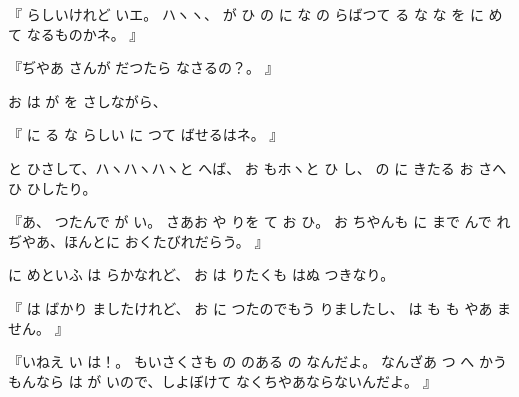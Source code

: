 『
らしいけれど
いエ。
ハヽヽ、
が
ひ
の
に
な
の
らばつて
る
な
な
を
に
めて
なるものかネ。
』

『ぢやあ
さんが
だつたら
なさるの？。
』

お
は
が
を
さしながら、

『
に
る
な
らしい
に
つて
ばせるはネ。
』

と
ひさして、ハヽハヽハヽと
へば、
お
もホヽと
ひ
し、
の
に
きたる
お
さへ
ひ
ひしたり。

『あ\ninojiten{}、
つたんで
が
い。
さあお
や
りを
て
お
ひ。
お
ちやんも
に
まで
んで
れぢやあ、ほんとに
おくたびれだらう。
』

に
めといふ
は
らかなれど、
お
は
りたくも
はぬ
つきなり。

『
は
ばかり
ましたけれど、
お
に
つたのでもう
りましたし、
は
も
も
やあ
ません。
』

『い\ninojiten{}ねえ
い
は！。
もいさくさも
の
のある
の
なんだよ。
なんざあ
つ
へ
かうもんなら
は
が
いので、しよぼけて
なくちやあならないんだよ。
』

